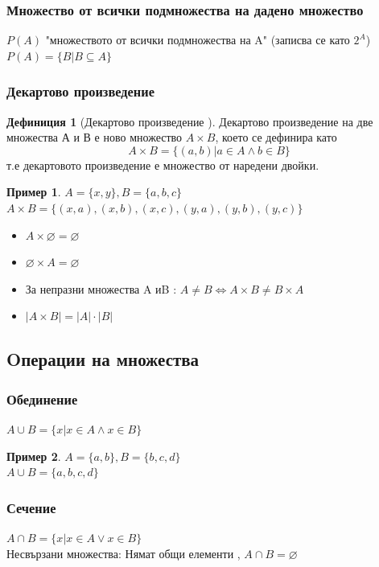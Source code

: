 \documentclass[fleqn, 12pt]{article}
\theoremstyle{definition}
\newtheorem{example}{Пример}[subsection]
\newtheorem{definition}{Дефиниция}[subsection]
\begin{document}
\subsubsection{Множество от всички подмножества на дадено множество}
$P(A)$ "множеството от всички подмножества на A" (записва се като $2^A$)\\
$P(A) = \{B | B\subseteq A \}$

\subsubsection{Декартово произведение}
\begin{definition}[Декартово произведение ]
Декартово произведение на две множества А и В е ново множество $A \times B$, което се дефинира като
$$A \times B = \{(a,b) | a\in A \land b \in B \}$$
т.е декартовото произведение е множество от наредени двойки. 
\end{definition}

\begin{example}
$A = \{x, y\}, B = \{a, b, c\}$\\
$A \times B = \{(x, a), (x, b), (x, c), (y, a), (y, b), (y, c)\}$
\end{example}
 
\begin{itemize}
	\item $A \times \varnothing = \varnothing$
	\item $\varnothing \times A = \varnothing$
	\item За непразни множества A иB : $A\neq B \Leftrightarrow A \times B \neq B \times A$
	\item $|A \times B| = |A|\cdot |B|$
\end{itemize}

\subsection {Oперации на множества} 
 
\subsubsection{Обединение}
$A \cup B = \{x | x\in A \land x \in B\}$
\begin{example}
$A = \{a, b\}, B = \{b, c, d\}$\\
$A \cup B = \{a, b, c, d\}$
\end{example}

\subsubsection{Сечение}
$A \cap B = \{x | x\in A \lor x \in B\}$\\
Несвързани множества: Нямат общи елементи , $A \cap B = \varnothing$
\end{document}
